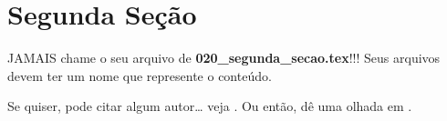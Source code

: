 \section{Segunda Seção}

  JAMAIS chame o seu arquivo de \textbf{020\_segunda\_secao.tex}!!!
  Seus arquivos devem ter um nome que represente o conteúdo.

  Se quiser,
  pode citar algum autor{\ldots}
  veja \cite[theorem 2.5]{walters}.
  Ou então,
  dê uma olhada em \cite[corolary 5.2]{misiurewicz}.
